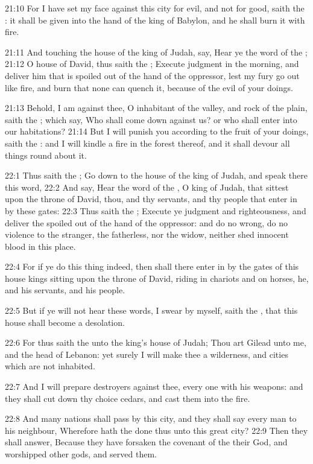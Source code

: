 21:10 For I have set my face against this city for evil, and not for good, saith the \LORD: it shall be given into the hand of the king of Babylon, and he shall burn it with fire.

21:11 And touching the house of the king of Judah, say, Hear ye the word of the \LORD; 21:12 O house of David, thus saith the \LORD; Execute judgment in the morning, and deliver him that is spoiled out of the hand of the oppressor, lest my fury go out like fire, and burn that none can quench it, because of the evil of your doings.

21:13 Behold, I am against thee, O inhabitant of the valley, and rock of the plain, saith the \LORD; which say, Who shall come down against us? or who shall enter into our habitations?  21:14 But I will punish you according to the fruit of your doings, saith the \LORD: and I will kindle a fire in the forest thereof, and it shall devour all things round about it.

22:1 Thus saith the \LORD; Go down to the house of the king of Judah, and speak there this word, 22:2 And say, Hear the word of the \LORD, O king of Judah, that sittest upon the throne of David, thou, and thy servants, and thy people that enter in by these gates: 22:3 Thus saith the \LORD; Execute ye judgment and righteousness, and deliver the spoiled out of the hand of the oppressor: and do no wrong, do no violence to the stranger, the fatherless, nor the widow, neither shed innocent blood in this place.

22:4 For if ye do this thing indeed, then shall there enter in by the gates of this house kings sitting upon the throne of David, riding in chariots and on horses, he, and his servants, and his people.

22:5 But if ye will not hear these words, I swear by myself, saith the \LORD, that this house shall become a desolation.

22:6 For thus saith the \LORD unto the king's house of Judah; Thou art Gilead unto me, and the head of Lebanon: yet surely I will make thee a wilderness, and cities which are not inhabited.

22:7 And I will prepare destroyers against thee, every one with his weapons: and they shall cut down thy choice cedars, and cast them into the fire.

22:8 And many nations shall pass by this city, and they shall say every man to his neighbour, Wherefore hath the \LORD done thus unto this great city?  22:9 Then they shall answer, Because they have forsaken the covenant of the \LORD their God, and worshipped other gods, and served them.

